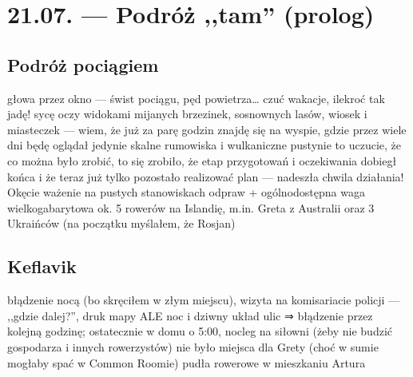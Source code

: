 \chapter*{21.07. --- Podróż ,,tam'' (prolog)}


\section*{Podróż pociągiem}

głowa przez okno --- świst pociągu, pęd powietrza… czuć wakacje, ilekroć tak jadę!
sycę oczy widokami mijanych brzezinek, sosnownych lasów, wiosek i miasteczek --- wiem, że już za parę godzin znajdę się na wyspie, gdzie przez wiele dni będę oglądał jedynie skalne rumowiska i wulkaniczne pustynie
to uczucie, że co można było zrobić, to się zrobiło, że etap przygotowań i oczekiwania dobiegł końca i że teraz już tylko pozostało realizować plan --- nadeszła chwila działania!
Okęcie
ważenie na pustych stanowiskach odpraw + ogólnodostępna waga wielkogabarytowa
ok. 5 rowerów na Islandię, m.in. Greta z Australii oraz 3 Ukraińców (na początku myślałem, że Rosjan)

\section*{Keflavik}

błądzenie nocą (bo skręciłem w złym miejscu), wizyta na komisariacie policji --- ,,gdzie dalej?'', druk mapy ALE noc i dziwny układ ulic ⇒ błądzenie przez kolejną godzinę; ostatecznie w domu o 5:00, nocleg na siłowni (żeby nie budzić gospodarza i innych rowerzystów)
nie było miejsca dla Grety (choć w sumie mogłaby spać w Common Roomie)
pudła rowerowe w mieszkaniu Artura
